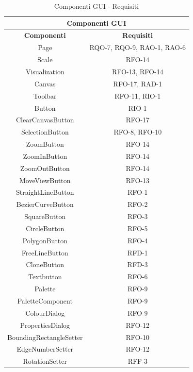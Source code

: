\begin{table}[h]
\begin{center}
     \begin{tabular}
           {@{\extracolsep{\fill}}|c|c|}
     \hline
     \multicolumn{2}{|c|}{ \textbf{Componenti GUI} } \\
     \hline
      \textbf{Componenti} & \textbf{Requisiti} \\
      \hline
     Page & RQO-7, RQO-9, RAO-1, RAO-6\\
     \hline
     Scale & RFO-14\\
     \hline
     Visualization & RFO-13, RFO-14 \\
     \hline   
     Canvas & RFO-17, RAD-1 \\
     \hline  
     Toolbar & RFO-11, RIO-1 \\
     \hline        
     Button & RIO-1\\
     \hline
     ClearCanvasButton & RFO-17\\
     \hline     
     SelectionButton & RFO-8, RFO-10\\
     \hline     
     ZoomButton & RFO-14\\
     \hline       
     ZoomInButton & RFO-14\\
     \hline    
     ZoomOutButton & RFO-14\\
     \hline 
     MoveViewButton & RFO-13\\
     \hline
     StraightLineButton & RFO-1\\
     \hline
 	 BezierCurveButton & RFO-2\\
 	 \hline
 	 SquareButton & RFO-3\\
 	 \hline
 	 CircleButton & RFO-5\\
 	 \hline 
 	 PolygonButton & RFO-4\\
 	 \hline
 	 FreeLineButton & RFD-1\\
 	 \hline
 	 CloneButton & RFD-3\\
 	 \hline
 	 Textbutton & RFO-6\\
 	 \hline
     Palette & RFO-9 \\
     \hline
     PaletteComponent & RFO-9\\
     \hline
     ColourDialog & RFO-9\\
     \hline
     PropertiesDialog & RFO-12 \\ 
     \hline 
     BoundingRectangleSetter & RFO-10 \\
     \hline     	              
	 EdgeNumberSetter & RFO-12\\
	 \hline
	 RotationSetter & RFF-3 \\
    \hline %
    \end{tabular}
  \caption{Componenti GUI - Requisiti} %
  \label{tab:requisitiGUI}
  \end{center}
\end{table}
\newpage

